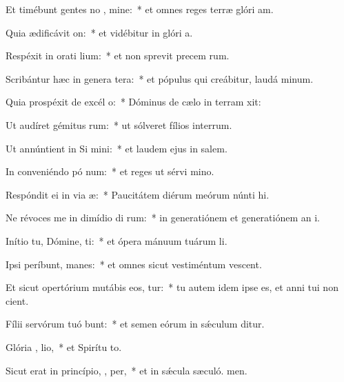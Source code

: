 \item Et timébunt gentes no , mine:~* et omnes reges terræ glóri am.
\item Quia ædificávit  on:~* et vidébitur in glóri a.
\item Respéxit in orati lium:~* et non sprevit precem rum.
\item Scribántur hæc in genera tera:~* et pópulus qui creábitur, laudá minum.
\item Quia prospéxit de excél  o:~* Dóminus de cælo in terram xit:
\item Ut audíret gémitus rum:~* ut sólveret fílios interrum.
\item Ut annúntient in Si  mini:~* et laudem ejus in salem.
\item In conveniéndo pó  num:~* et reges ut sérvi mino.
\item Respóndit ei in via  æ:~* Paucitátem diérum meórum núnti hi.
\item Ne révoces me in dimídio di rum:~* in generatiónem et generatiónem an i.
\item Inítio tu, Dómine,  ti:~* et ópera mánuum tuárum  li.
\item Ipsi períbunt,   manes:~* et omnes sicut vestiméntum vescent.
\item Et sicut opertórium mutábis eos,  tur:~* tu autem idem ipse es, et anni tui non cient.
\item Fílii servórum tuó bunt:~* et semen eórum in sǽculum ditur.
\item Glória ,  lio,~* et Spirítu to.
\item Sicut erat in princípio,  ,  per,~* et in sǽcula sæculó. men.
